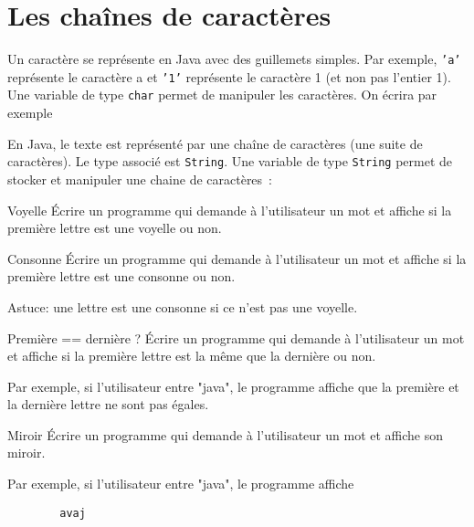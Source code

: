 \documentclass[a4paper,11pt]{article}
\begin{document}
\section{Les chaînes de caractères}
 
 	Un caractère se représente en Java avec des guillemets simples.
	Par exemple, \texttt{'a'} représente le caractère a et \texttt{'1'} représente le caractère 1 (et non pas l'entier 1).
	Une variable de type \texttt{char} permet de manipuler les caractères.
	On écrira par exemple  
	
	En Java, le texte est représenté par une chaîne de caractères (une suite de caractères). 
	Le type associé est \texttt{String}.
	Une variable de type \texttt{String} permet de stocker et manipuler une chaine de caractères~:

	\bigskip


	\begin{Exercice}{Voyelle}	
		\'Ecrire un programme qui demande à l'utilisateur 
		un mot et affiche si la première lettre est une voyelle ou non.
	\end{Exercice}

	\begin{Exercice}{Consonne}	
		\'Ecrire un programme qui demande à l'utilisateur 
		un mot et affiche si la première lettre est une consonne ou non.
		
		Astuce: une lettre est une consonne si ce n'est pas une voyelle.
	\end{Exercice}

	
	\begin{Exercice}{Première == dernière ?}	
		\'Ecrire un programme qui demande à l'utilisateur 
		un mot et affiche si la première lettre est la même que la dernière ou non.
		
		Par exemple, si l'utilisateur entre "java", le programme affiche que la première et 
		la dernière lettre ne sont pas égales.
	\end{Exercice}

	\begin{Exercice}{Miroir}	
		\'Ecrire un programme qui demande à l'utilisateur 
		un mot et affiche son miroir.
		
		Par exemple, si l'utilisateur entre "java", le programme affiche
		
		\begin{verbatim}
		avaj
		\end{verbatim}
	\end{Exercice}
\end{document}
